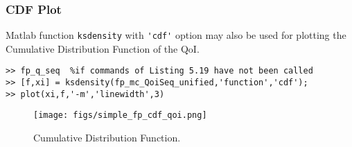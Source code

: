 \subsubsection{CDF Plot}

Matlab function \verb+ksdensity+ with \verb+'cdf'+ option may also be used for plotting the Cumulative Distribution Function of the QoI.

\begin{lstlisting}[label=matlab:fp_cdf_qoi,caption={Matlab code for the QoI CDF plot displayed in Figure \ref{fig:simple_sfp_cdf}.}]
% inside Matlab
>> fp_q_seq  %if commands of Listing 5.19 have not been called
>> [f,xi] = ksdensity(fp_mc_QoiSeq_unified,'function','cdf');
>> plot(xi,f,'-m','linewidth',3)
\end{lstlisting}

\begin{figure}[p]
\centering 
\texttt{[image: figs/simple\_fp\_cdf\_qoi.png]}
\vspace*{-10pt}
\caption{Cumulative Distribution Function.}
\label{fig:simple_sfp_cdf}
\end{figure}
